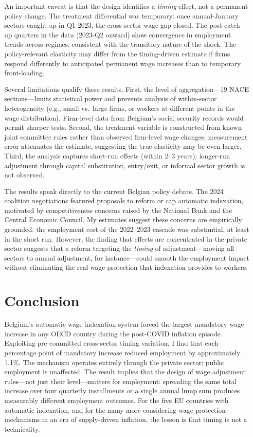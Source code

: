 \documentclass[12pt]{article}
\begin{document}
An important caveat is that the design identifies a \textit{timing} effect, not a permanent policy change. The treatment differential was temporary: once annual-January sectors caught up in Q1 2023, the cross-sector wage gap closed. The post-catch-up quarters in the data (2023-Q2 onward) show convergence in employment trends across regimes, consistent with the transitory nature of the shock. The policy-relevant elasticity may differ from the timing-driven estimate if firms respond differently to anticipated permanent wage increases than to temporary front-loading.

Several limitations qualify these results. First, the level of aggregation---19 NACE sections---limits statistical power and prevents analysis of within-sector heterogeneity (e.g., small vs.\ large firms, or workers at different points in the wage distribution). Firm-level data from Belgium's social security records would permit sharper tests. Second, the treatment variable is constructed from known joint committee rules rather than observed firm-level wage changes; measurement error attenuates the estimate, suggesting the true elasticity may be even larger. Third, the analysis captures short-run effects (within 2--3 years); longer-run adjustment through capital substitution, entry/exit, or informal sector growth is not observed.

The results speak directly to the current Belgian policy debate. The 2024 coalition negotiations featured proposals to reform or cap automatic indexation, motivated by competitiveness concerns raised by the National Bank and the Central Economic Council. My estimates suggest these concerns are empirically grounded: the employment cost of the 2022--2023 cascade was substantial, at least in the short run. However, the finding that effects are concentrated in the private sector suggests that a reform targeting the \textit{timing} of adjustment---moving all sectors to annual adjustment, for instance---could smooth the employment impact without eliminating the real wage protection that indexation provides to workers.

\section{Conclusion}

Belgium's automatic wage indexation system forced the largest mandatory wage increase in any OECD country during the post-COVID inflation episode. Exploiting pre-committed cross-sector timing variation, I find that each percentage point of mandatory increase reduced employment by approximately 1.1\%. The mechanism operates entirely through the private sector; public employment is unaffected. The result implies that the design of wage adjustment rules---not just their level---matters for employment: spreading the same total increase over four quarterly installments or a single annual lump sum produces measurably different employment outcomes. For the five EU countries with automatic indexation, and for the many more considering wage protection mechanisms in an era of supply-driven inflation, the lesson is that timing is not a technicality.
\end{document}

